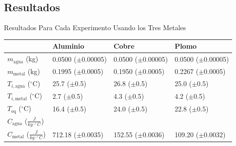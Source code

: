 \documentclass[12pt,a4paper]{config/myConfig}
\begin{document}
\subsection{Resultados}
\label{sec:RESULTADOS}

\begin{TableLab}{Resultados Para Cada Experimento Usando los Tres Metales}{}{}
   \setlength{\tabcolsep}{10pt} %
  \begin{tabular}{@{} >{\raggedright\arraybackslash}p{2.5cm}
                   >{\centering\arraybackslash}p{2.5cm}
                   >{\centering\arraybackslash}p{2.5cm}
                   >{\centering\arraybackslash}p{2.5cm}@{}}
    \toprule
     & \textbf{Aluminio} 
     & \textbf{Cobre} 
     & \textbf{Plomo} \\
    \midrule
    $m_{\mathrm{agua}}$ (kg)
      & \makecell{0.0500\\($\pm$0.00005)}
      & \makecell{0.0500\\($\pm$0.00005)}
      & \makecell{0.0500\\($\pm$0.00005)} \\

    $m_{\mathrm{metal}}$ (kg)
      & \makecell{0.1995\\($\pm$0.0005)}
      & \makecell{0.1950\\($\pm$0.0005)}
      & \makecell{0.2267\\($\pm$0.0005)} \\

    $T_{i,\mathrm{agua}}$ ($^{\circ}$C)
      & \makecell{25.7\\($\pm$0.5)}
      & \makecell{26.8\\($\pm$0.5)}
      & \makecell{25.0\\($\pm$0.5)} \\

    $T_{i,\mathrm{metal}}$ ($^{\circ}$C)
      & \makecell{2.7\\($\pm$0.5)}
      & \makecell{4.3\\($\pm$0.5)}
      & \makecell{4.2\\($\pm$0.5)} \\
      
    $T_{\mathrm{eq}}$ ($^{\circ}$C)
      & \makecell{16.4\\($\pm$0.5)}
      & \makecell{24.0\\($\pm$0.5)}
      & \makecell{22.8\\($\pm$0.5)} \\

    $C_{\mathrm{agua}}$ ($\frac{J}{kg \cdot ^{\circ}C }$)
      & 4186
      & 4186
      & 4186 \\

    $C_{\mathrm{metal}}$ ($\frac{J}{kg \cdot ^{\circ}C }$)
      & \makecell{712.18\\($\pm$0.0035)}
      & \makecell{152.55\\($\pm$0.0036)}
      & \makecell{109.20\\($\pm$0.0032)} \\
    \bottomrule
  \end{tabular}
\end{TableLab}
\end{document}
